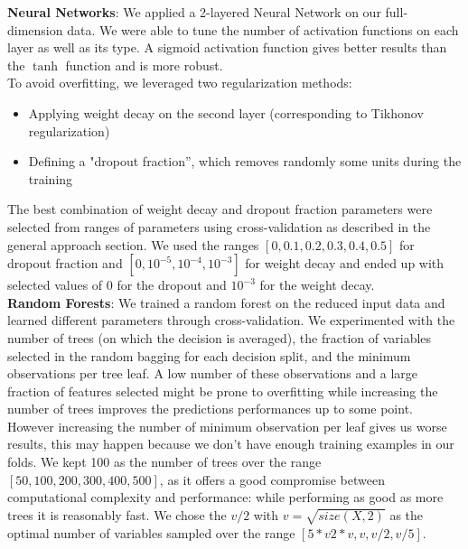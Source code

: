 \documentclass{article}
\begin{document}
    \textbf{Neural Networks}: We applied a 2-layered Neural Network on our full-dimension data. We were able to tune the number of activation functions on each layer as well as its type. A sigmoid activation function gives better results than the $\tanh$ function and is more robust.\\
  To avoid overfitting, we leveraged two regularization methods:
  \begin{itemize}
   	\item Applying weight decay on the second layer (corresponding to Tikhonov regularization)
	  \item Defining a "dropout fraction'', which removes randomly some units during the training \cite{dropout}
  \end{itemize}
	The best combination of weight decay and dropout fraction parameters were selected from ranges of parameters using cross-validation as described in the general approach section. We used  the ranges $[0, 0.1, 0.2, 0.3, 0.4, 0.5]$ for dropout fraction and $[0, 10^{-5}, 10^{-4}, 10^{-3}]$ for weight decay and ended up with selected values of $0$ for the dropout and $10^{-3}$ for the weight decay.\\
  
    \textbf{Random Forests}: We trained a random forest on the reduced input data and learned different parameters through cross-validation. We experimented with the number of trees (on which the decision is averaged), the fraction of variables selected in the random bagging for each decision split, and the minimum observations per tree leaf. A low number of these observations and a large fraction of features selected might be prone to overfitting while increasing the number of trees improves the predictions performances up to some point. However increasing the number of minimum observation per leaf gives us worse results, this may happen because we don't have enough training examples in our folds. We kept 100 as the number of trees over the range $[50, 100, 200, 300, 400, 500]$, as it offers a good compromise between computational complexity and performance:  while performing as good as more trees it is reasonably fast. We chose the $v/ 2$ with $v = \sqrt{size(X,2)}$ as the optimal number of variables sampled over the range $[5*v 2*v, v, v/ 2, v/ 5]$.
\end{document}

